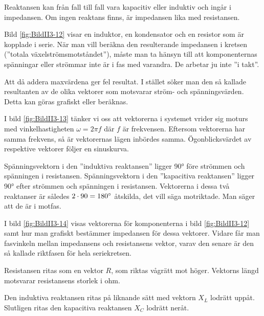 Reaktansen kan från fall till fall vara kapacitiv eller induktiv och ingår i
impedansen.
Om ingen reaktans finns, är impedansen lika med resistansen.


Bild \ref{fig:BildII3-12} visar en induktor, en kondensator och en resistor
som är kopplade i serie.
När man vill beräkna den resulterande impedansen i kretsen
(''totala växelströmsmotståndet''), måste man ta hänsyn till att komponenternas
spänningar eller strömmar inte är i fas med varandra.
De arbetar ju inte ''i takt''.

Att då addera maxvärdena ger fel resultat.
I stället söker man den så kallade resultanten av de olika vektorer som
motsvarar ström- och spänningsvärden.
Detta kan göras grafiskt eller beräknas.


I bild \ref{fig:BildII3-13} tänker vi oss att vektorerna i systemet vrider sig moturs med vinkelhastigheten
\(\omega = 2\pi f\) där \(f\) är frekvensen.
Eftersom vektorerna har samma frekvens, så är vektorernas lägen inbördes samma.
Ögonblicksvärdet av respektive vektorer följer en sinuskurva.

Spänningsvektorn i den ''induktiva reaktansen'' ligger \ang{90} före strömmen
och spänningen i resistansen.
Spänningsvektorn i den ''kapacitiva reaktansen'' ligger \ang{90} efter
strömmen och spänningen i resistansen.
Vektorerna i dessa två reaktanser är således \(2 \cdot 90 = 180\degree\)
åtskilda, det vill säga motriktade.
Man säger att de är i motfas.


I bild \ref{fig:BildII3-14} visas vektorerna för komponenterna i bild
\ref{fig:BildII3-12} samt hur man grafiskt bestämmer impedansen för dessa
vektorer.
Vidare får man fasvinkeln mellan impedansens och resistansens vektor, varav den
senare är den så kallade riktfasen för hela seriekretsen.

Resistansen ritas som en vektor \(R\), som riktas vågrätt mot höger.
Vektorns längd motsvarar resistansens storlek i ohm.

Den induktiva reaktansen ritas på liknande sätt med vektorn \(X_L\) lodrätt
uppåt.
Slutligen ritas den kapacitiva reaktansen \(X_C\) lodrätt neråt.

